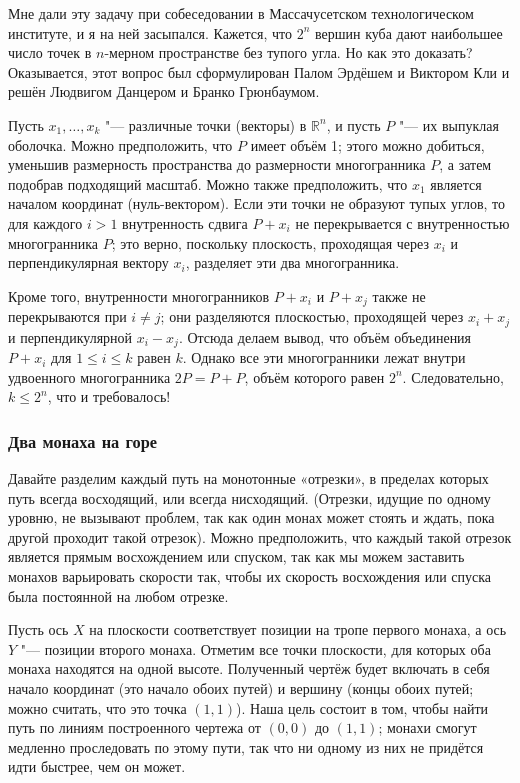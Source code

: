 \documentclass[twoside]{book}
\begin{document}
Мне дали эту задачу при собеседовании в Массачусетском технологическом институте, и я на ней засыпался.
Кажется, что $2^n$ вершин куба дают наибольшее число точек в $n$-мерном пространстве без тупого угла.
Но как это доказать?
Оказывается, этот вопрос был сформулирован Палом Эрдёшем и Виктором Кли и решён Людвигом Данцером и Бранко Грюнбаумом. %

\medskip

Пусть $x_1,\dots,x_k$ "--- различные точки (векторы) в $\mathbb{R}^n$, и пусть $P$ "--- их выпуклая оболочка.
Можно предположить, что $P$ имеет объём 1;
этого можно добиться, уменьшив размерность пространства до размерности многогранника $P$, а затем подобрав подходящий масштаб.
Можно также предположить, что $x_1$ является началом координат (нуль-вектором).
Если эти точки не образуют тупых углов, то для каждого $i>1$ внутренность сдвига $P+x_i$ не перекрывается с внутренностью многогранника $P$;
это верно, поскольку плоскость, проходящая через $x_i$ и перпендикулярная вектору $x_i$, разделяет эти два многогранника.

Кроме того, внутренности многогранников $P+x_i$ и $P+x_j$ также не перекрываются при $i\ne j$;
они разделяются плоскостью, проходящей через $x_i+x_j$ и перпендикулярной $x_i-x_j$.
Отсюда делаем вывод, что объём объединения $P+x_i$ для $1 \le i \le k$ равен $k$.
Однако все эти многогранники лежат внутри удвоенного многогранника $2P = P+P$, объём которого равен $2^n$. Следовательно, $k \le 2^n$, что и требовалось!
\heart



\subsubsection*{Два монаха на горе}

Давайте разделим каждый путь на монотонные «отрезки», в пределах которых путь всегда восходящий, или всегда нисходящий.
(Отрезки, идущие по одному уровню, не вызывают проблем, так как один монах может стоять и ждать, пока другой проходит такой отрезок).
Можно предположить, что каждый такой отрезок является прямым восхождением или спуском, так как мы можем заставить монахов варьировать скорости так, чтобы их скорость восхождения или спуска была постоянной на любом отрезке.

Пусть ось $X$ на плоскости соответствует позиции на тропе первого монаха, а ось $Y$ "--- позиции второго монаха.
Отметим все точки плоскости, для которых оба монаха находятся на одной высоте.
Полученный чертёж будет включать в себя начало координат (это начало обоих путей) и вершину (концы обоих путей; можно считать, что это точка $(1,1)$).
Наша цель состоит в том, чтобы найти путь по линиям построенного чертежа от $(0,0)$ до $(1,1)$;
монахи смогут медленно проследовать по этому пути, так что ни одному из них не придётся идти быстрее, чем он может.
\end{document}

